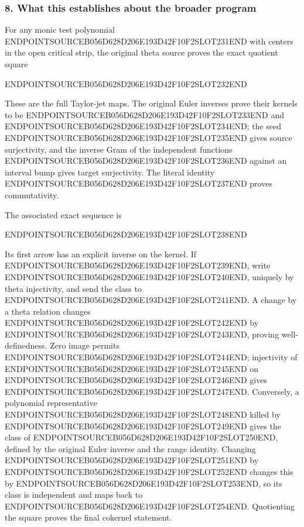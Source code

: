 \subsubsection{8. What this establishes about the broader program}\label{endpoint-gamma_review--what-this-establishes-about-the-broader-program}

For any monic test polynomial ENDPOINTSOURCEB056D628D206E193D42F10F2SLOT231END with centers in the open critical strip, the original theta source proves the exact quotient square

ENDPOINTSOURCEB056D628D206E193D42F10F2SLOT232END

These are the full Taylor-jet maps. The original Euler inverses prove their kernels to be ENDPOINTSOURCEB056D628D206E193D42F10F2SLOT233END and ENDPOINTSOURCEB056D628D206E193D42F10F2SLOT234END; the seed ENDPOINTSOURCEB056D628D206E193D42F10F2SLOT235END gives source surjectivity, and the inverse Gram of the independent functions ENDPOINTSOURCEB056D628D206E193D42F10F2SLOT236END against an interval bump gives target surjectivity. The literal identity ENDPOINTSOURCEB056D628D206E193D42F10F2SLOT237END proves commutativity.

The associated exact sequence is

ENDPOINTSOURCEB056D628D206E193D42F10F2SLOT238END

Its first arrow has an explicit inverse on the kernel. If ENDPOINTSOURCEB056D628D206E193D42F10F2SLOT239END, write ENDPOINTSOURCEB056D628D206E193D42F10F2SLOT240END, uniquely by theta injectivity, and send the class to ENDPOINTSOURCEB056D628D206E193D42F10F2SLOT241END. A change by a theta relation changes ENDPOINTSOURCEB056D628D206E193D42F10F2SLOT242END by ENDPOINTSOURCEB056D628D206E193D42F10F2SLOT243END, proving well-definedness. Zero image permits ENDPOINTSOURCEB056D628D206E193D42F10F2SLOT244END; injectivity of ENDPOINTSOURCEB056D628D206E193D42F10F2SLOT245END on ENDPOINTSOURCEB056D628D206E193D42F10F2SLOT246END gives ENDPOINTSOURCEB056D628D206E193D42F10F2SLOT247END. Conversely, a polynomial representative ENDPOINTSOURCEB056D628D206E193D42F10F2SLOT248END killed by ENDPOINTSOURCEB056D628D206E193D42F10F2SLOT249END gives the class of ENDPOINTSOURCEB056D628D206E193D42F10F2SLOT250END, defined by the original Euler inverse and the range identity. Changing ENDPOINTSOURCEB056D628D206E193D42F10F2SLOT251END by ENDPOINTSOURCEB056D628D206E193D42F10F2SLOT252END changes this by ENDPOINTSOURCEB056D628D206E193D42F10F2SLOT253END, so its class is independent and maps back to ENDPOINTSOURCEB056D628D206E193D42F10F2SLOT254END. Quotienting the square proves the final cokernel statement.

